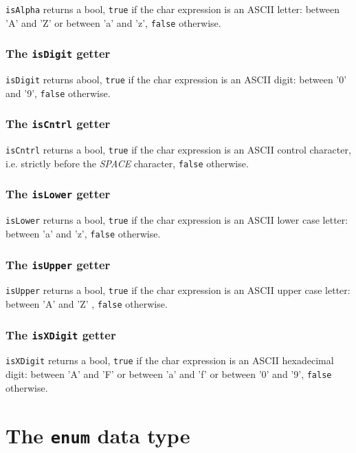 \documentclass[10pt,openright,twosides,final]{memoir}
\newcommand{\ccst}[1]{{\footnotesize\ttfamily\colorbox{light-blue}{'#1'}}}
\newcommand{\gtlinline}[1]{\colorbox{light-blue}{\lstinline[language=gtl]{#1}}}
\begin{document}
\gtlinline{isAlpha} returns a bool, \gtlinline{true} if the char expression is an ASCII letter: between \ccst{A} and \ccst{Z} or between \ccst{a} and \ccst{z}, \gtlinline{false} otherwise.

\subsubsection{The \texttt{isDigit} getter}

\gtlinline{isDigit} returns abool, \gtlinline{true} if the char expression is an ASCII digit: between \ccst{0} and \ccst{9}, \gtlinline{false} otherwise.

\subsubsection{The \texttt{isCntrl} getter}

\gtlinline{isCntrl} returns a bool, \gtlinline{true} if the char expression is an ASCII control character, i.e. strictly before the {\em SPACE} character, \gtlinline{false} otherwise.

\subsubsection{The \texttt{isLower} getter}

\gtlinline{isLower} returns a bool, \gtlinline{true} if the char expression is an ASCII lower case letter: between \ccst{a} and \ccst{z}, \gtlinline{false} otherwise.

\subsubsection{The \texttt{isUpper} getter}

\gtlinline{isUpper} returns a bool, \gtlinline{true} if the char expression is an ASCII upper case letter: between \ccst{A} and \ccst{Z} , \gtlinline{false} otherwise.

\subsubsection{The \texttt{isXDigit} getter}

\gtlinline{isXDigit} returns a bool, \texttt{true} if the char expression is an ASCII hexadecimal digit: between \ccst{A} and \ccst{F} or between \ccst{a} and \ccst{f} or between \ccst{0} and \ccst{9}, \texttt{false} otherwise.
  
\section{The \texttt{enum} data type}
\end{document}
